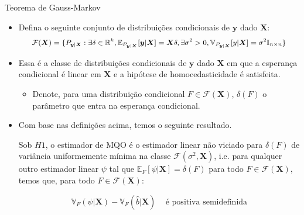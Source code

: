 \documentclass[11pt]{beamer}
\begin{document}
\begin{frame}{Teorema de Gauss-Markov}
	\begin{itemize}
		\item Defina o seguinte conjunto de distribuições condicionais de $\boldsymbol{y}$ dado $\boldsymbol{X}$:
		$$\small \mathcal{F}(\boldsymbol{X}) = \{P_{\boldsymbol{y}|\boldsymbol{X}}: \exists \delta \in \mathbb{R}^k,  \mathbb{E}_{P_{\boldsymbol{y}|\boldsymbol{X}}} [\boldsymbol{y}|\boldsymbol{X}] = \boldsymbol{X}\delta, \exists \sigma^2 > 0, \mathbb{V}_{P_{\boldsymbol{y}|\boldsymbol{X}}}[ y|\boldsymbol{X}] = \sigma^2 \mathbb{I}_{n\times n}\}$$
		\item Essa é a classe de distribuições condicionais de $\boldsymbol{y}$ dado $\boldsymbol{X}$ em que a esperança condicional é linear em $\boldsymbol{X}$ e a hipótese de homocedasticidade é satisfeita.
		\begin{itemize}
			\item Denote, para uma distribuição condicional $F \in \mathcal{F}(\boldsymbol{X}) $, $\delta(F)$ o parâmetro que entra na esperança condicional.
		\end{itemize}
		\item Com base nas definições acima, temos o seguinte resultado.
		\begin{theorem}
		 Sob $H1$, o estimador de MQO é o estimador {\color{red}linear} não viciado para $\delta(F)$ de variância uniformemente mínima na classe $\mathcal{F}(\sigma^2,\boldsymbol{X})$, i.e. para qualquer outro estimador  {\color{red}linear} $\psi$ tal que $\mathbb{E}_{F}[\psi|\boldsymbol{X}] = \delta(F)$ para todo $F \in \mathcal{F}(\boldsymbol{X})$, temos que, para todo $F \in \mathcal{F}(\boldsymbol{X})$:
			
			$$\mathbb{V}_{F}(\psi|\boldsymbol{X}) - \mathbb{V}_{F}(\hat{b}|\boldsymbol{X})\, \quad \text{é positiva semidefinida} $$
		\end{theorem}
	\end{itemize}
\end{frame}
\end{document}
